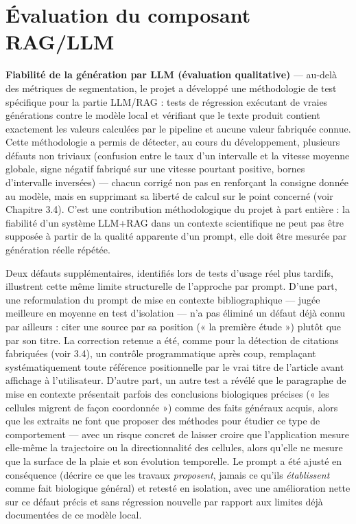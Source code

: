 \documentclass[12pt,a4paper]{report}
\begin{document}
\section{Évaluation du composant RAG/LLM}

\textbf{Fiabilité de la génération par LLM (évaluation qualitative)} --- au-delà des métriques de segmentation, le projet a développé une méthodologie de test spécifique pour la partie LLM/RAG : tests de régression exécutant de vraies générations contre le modèle local et vérifiant que le texte produit contient exactement les valeurs calculées par le pipeline et aucune valeur fabriquée connue. Cette méthodologie a permis de détecter, au cours du développement, plusieurs défauts non triviaux (confusion entre le taux d'un intervalle et la vitesse moyenne globale, signe négatif fabriqué sur une vitesse pourtant positive, bornes d'intervalle inversées) --- chacun corrigé non pas en renforçant la consigne donnée au modèle, mais en supprimant sa liberté de calcul sur le point concerné (voir Chapitre 3.4). C'est une contribution méthodologique du projet à part entière : la fiabilité d'un système LLM+RAG dans un contexte scientifique ne peut pas être supposée à partir de la qualité apparente d'un prompt, elle doit être mesurée par génération réelle répétée.

Deux défauts supplémentaires, identifiés lors de tests d'usage réel plus tardifs, illustrent cette même limite structurelle de l'approche par prompt. D'une part, une reformulation du prompt de mise en contexte bibliographique --- jugée meilleure en moyenne en test d'isolation --- n'a pas éliminé un défaut déjà connu par ailleurs : citer une source par sa position (« la première étude ») plutôt que par son titre. La correction retenue a été, comme pour la détection de citations fabriquées (voir 3.4), un contrôle programmatique après coup, remplaçant systématiquement toute référence positionnelle par le vrai titre de l'article avant affichage à l'utilisateur. D'autre part, un autre test a révélé que le paragraphe de mise en contexte présentait parfois des conclusions biologiques précises (« les cellules migrent de façon coordonnée ») comme des faits généraux acquis, alors que les extraits ne font que proposer des méthodes pour étudier ce type de comportement --- avec un risque concret de laisser croire que l'application mesure elle-même la trajectoire ou la directionnalité des cellules, alors qu'elle ne mesure que la surface de la plaie et son évolution temporelle. Le prompt a été ajusté en conséquence (décrire ce que les travaux \textit{proposent}, jamais ce qu'ils \textit{établissent} comme fait biologique général) et retesté en isolation, avec une amélioration nette sur ce défaut précis et sans régression nouvelle par rapport aux limites déjà documentées de ce modèle local.
\end{document}
